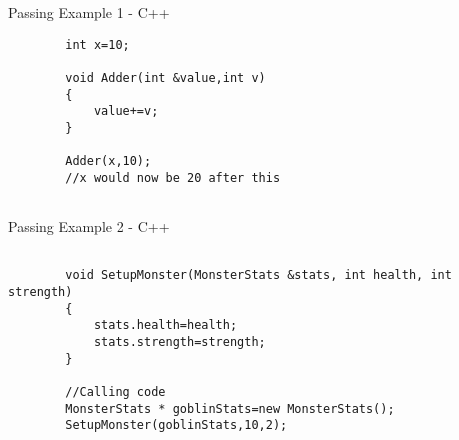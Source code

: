 \begin{frame}[fragile]{Passing Example 1 - C++}
	\begin{lstlisting}
		int x=10;
	
		void Adder(int &value,int v)
		{
			value+=v;	
		}
	
		Adder(x,10);
		//x would now be 20 after this		
	
	\end{lstlisting}
\end{frame}

\begin{frame}[fragile]{Passing Example 2 - C++}
	\begin{lstlisting}
	
		void SetupMonster(MonsterStats &stats, int health, int strength)
		{
			stats.health=health;
			stats.strength=strength;
		}
		
		//Calling code
		MonsterStats * goblinStats=new MonsterStats();
		SetupMonster(goblinStats,10,2);
	\end{lstlisting}
\end{frame}

